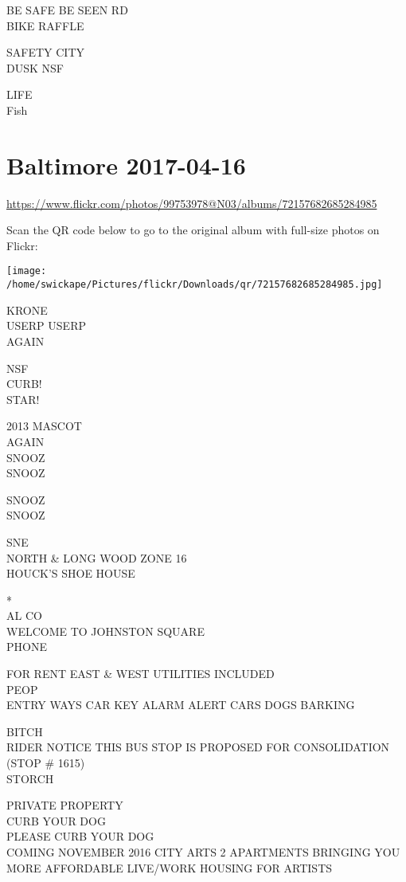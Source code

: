 \documentclass[10pt,letterpaper]{article}
\begin{document}
BE SAFE BE SEEN RD\\
BIKE RAFFLE

SAFETY CITY\\
DUSK NSF

LIFE\\
Fish
\pagebreak

\section*{Baltimore 2017-04-16}

\url{https://www.flickr.com/photos/99753978@N03/albums/72157682685284985}

Scan the QR code below to go to the original album with full-size photos on Flickr:

\texttt{[image: /home/swickape/Pictures/flickr/Downloads/qr/72157682685284985.jpg]}
\pagebreak

KRONE\\
USERP USERP\\
AGAIN

NSF\\
CURB!\\
STAR!

2013 MASCOT\\
AGAIN\\
SNOOZ\\
SNOOZ

SNOOZ\\
SNOOZ

SNE\\
NORTH \& LONG WOOD ZONE 16\\
HOUCK'S SHOE HOUSE

*\\
AL CO\\
WELCOME TO JOHNSTON SQUARE\\
PHONE

FOR RENT EAST \& WEST UTILITIES INCLUDED\\
PEOP\\
ENTRY WAYS CAR KEY ALARM ALERT CARS DOGS BARKING

BITCH\\
RIDER NOTICE THIS BUS STOP IS PROPOSED FOR CONSOLIDATION (STOP \# 1615)\\
STORCH

PRIVATE PROPERTY\\
CURB YOUR DOG\\
PLEASE CURB YOUR DOG\\
COMING NOVEMBER 2016 CITY ARTS 2 APARTMENTS BRINGING YOU MORE AFFORDABLE LIVE/WORK HOUSING FOR ARTISTS
\end{document}
